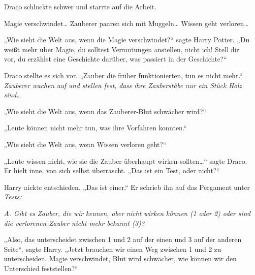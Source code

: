 Draco schluckte schwer und starrte auf die Arbeit.

Magie verschwindet… Zauberer paaren sich mit Muggeln… Wissen geht verloren…

„Wie sieht die Welt aus, wenn die Magie verschwindet?“ sagte Harry Potter. „Du weißt mehr über Magie, du solltest Vermutungen anstellen, nicht ich! Stell dir vor, du erzählst eine Geschichte darüber, was passiert in der Geschichte?“

Draco stellte es sich vor. „Zauber die früher funktionierten, tun es nicht mehr.“ \emph{Zauberer wachen auf und stellen fest, dass ihre Zauberstäbe nur ein Stück Holz sind…}

„Wie sieht die Welt aus, wenn das Zauberer-Blut schwächer wird?“

„Leute können nicht mehr tun, was ihre Vorfahren konnten.“

„Wie sieht die Welt aus, wenn Wissen verloren geht?“

„Leute wissen nicht, wie sie die Zauber überhaupt wirken sollten…“ sagte Draco. Er hielt inne, von sich selbst überrascht. „Das ist ein Test, oder nicht?“

Harry nickte entschieden. „Das ist einer.“ Er schrieb ihn auf das Pergament unter \emph{Tests:}

\emph{A. Gibt es Zauber, die wir kennen, aber nicht wirken können (1 oder 2) oder sind die verlorenen Zauber nicht mehr bekannt (3)?}

„Also, das unterscheidet zwischen 1 und 2 auf der einen und 3 auf der anderen Seite“, sagte Harry. „Jetzt brauchen wir einen Weg zwischen 1 und 2 zu unterscheiden. Magie verschwindet, Blut wird schwächer, wie können wir den Unterschied feststellen?“

